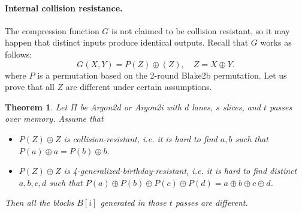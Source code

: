 \documentclass[a4paper]{article}
\newtheorem{theorem}{Theorem}
\begin{document}
 \paragraph{Internal collision resistance.} The compression function $G$ is not claimed to be collision resistant, so it may happen that distinct inputs produce identical outputs. Recall
that $G$ works as follows:
$$
G(X,Y) = P(Z)\oplus (Z), \quad Z = X\oplus Y.
$$
where $P$ is a permutation based on the 2-round Blake2b permutation. Let us prove that all $Z$ are different under certain assumptions.
\begin{theorem}
  Let $\Pi$ be \textsf{Argon2d} or \textsf{Argon2i} with $d$ lanes, $s$ slices, and $t$ passes over memory. Assume that
   \begin{itemize}
     \item $P(Z)\oplus Z$ is collision-resistant, i.e. it is hard to find $a,b$ such that $P(a)\oplus a = P(b)\oplus b$.
     \item $P(Z)\oplus Z$ is 4-generalized-birthday-resistant, i.e. it is hard to find distinct $a,b,c,d$ such that $P(a)\oplus P(b)\oplus P(c)\oplus P(d) = a\oplus b\oplus c \oplus d$.
   \end{itemize}Then all the blocks $B[i]$ generated in those $t$ passes are different.
\end{theorem}
\end{document}
